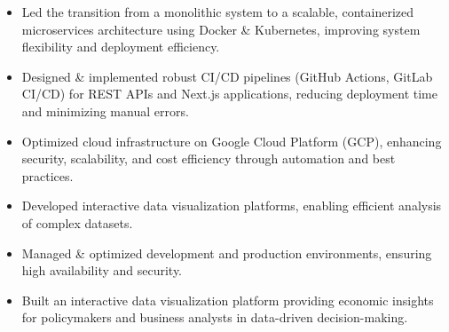 \begin{itemize}
\item Led the transition from a monolithic system to a scalable, containerized microservices architecture using Docker \& Kubernetes, improving system flexibility and deployment efficiency.
\item Designed \& implemented robust CI/CD pipelines (GitHub Actions, GitLab CI/CD) for REST APIs and Next.js applications, reducing deployment time and minimizing manual errors.
\item Optimized cloud infrastructure on Google Cloud Platform (GCP), enhancing security, scalability, and cost efficiency through automation and best practices.
\end{itemize}

\divider

\begin{itemize}
\item Developed interactive data visualization platforms, enabling efficient analysis of complex datasets.
\item Managed \& optimized development and production environments, ensuring high availability and security.
\end{itemize}

\divider

\begin{itemize}
\item Built an interactive data visualization platform providing economic insights for policymakers and business analysts in data-driven decision-making.
\end{itemize}